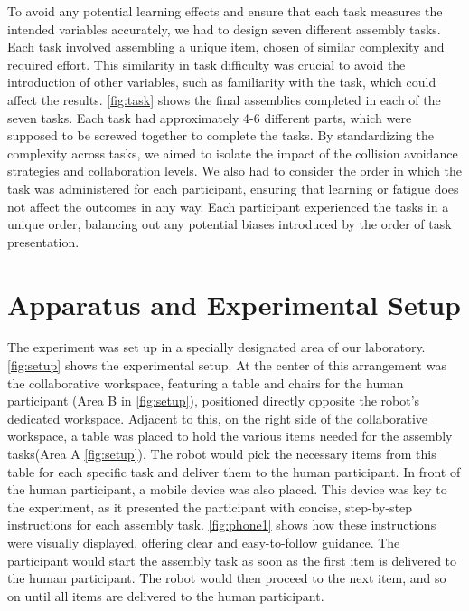 To avoid any potential learning effects and ensure that each task measures the intended
variables accurately, we had to design seven different assembly tasks. Each task involved
assembling a unique item, chosen of similar complexity and required effort. This
similarity in task difficulty was crucial to avoid the introduction of other variables, such
as familiarity with the task, which could affect the results.   \autoref{fig:task} shows the final assemblies completed in each of the seven tasks. Each task had approximately 4-6 different
parts, which were supposed to be screwed together to complete the tasks. By standardizing
the complexity across tasks, we aimed to isolate the impact of the collision avoidance
strategies and collaboration levels. We also had to consider the order in which the task
was administered for each participant, ensuring that learning or fatigue does not affect the
outcomes in any way. Each participant experienced the tasks in a unique order, balancing out any potential biases introduced by the order of task presentation.


\section{Apparatus and Experimental Setup} \label{sec:expprot}
The experiment was set up in a specially designated area of our laboratory. \autoref{fig:setup} shows the experimental setup. 
 At the center of this arrangement was the collaborative workspace, featuring a table and chairs for the human participant (Area B in  \autoref{fig:setup}), positioned directly opposite the robot's dedicated workspace. Adjacent to this, on the right side of the collaborative workspace, a table was placed to hold the various items needed for the assembly tasks(Area A \autoref{fig:setup}). The robot would pick the necessary items from this table for each specific task and deliver them to the human participant. In front of the human participant, a mobile device was also placed. This device was key to the experiment, as it presented the participant with concise, step-by-step instructions for each assembly task. \autoref{fig:phone1} shows how these instructions were visually displayed, offering clear and easy-to-follow guidance. The participant would start the assembly task as soon as the first item is delivered to the human participant. The robot would then proceed to the next item, and so on until all items are delivered to the human participant.




